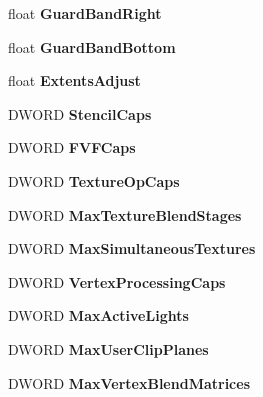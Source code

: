 \begin{DoxyCompactItemize}
float {\bfseries Guard\+Band\+Right}
\item 
\mbox{\label{struct___d3_d_c_a_p_s9_a34ac4032d786147f057750ec9b95ce71}} 
float {\bfseries Guard\+Band\+Bottom}
\item 
\mbox{\label{struct___d3_d_c_a_p_s9_aa41d6e883d3f68844b024e62942e3dd5}} 
float {\bfseries Extents\+Adjust}
\item 
\mbox{\label{struct___d3_d_c_a_p_s9_ad76d9ec88f7629e903bd767a4d9d4f0c}} 
D\+W\+O\+RD {\bfseries Stencil\+Caps}
\item 
\mbox{\label{struct___d3_d_c_a_p_s9_a76b5eb83a1b6f95d3cb099d84252556f}} 
D\+W\+O\+RD {\bfseries F\+V\+F\+Caps}
\item 
\mbox{\label{struct___d3_d_c_a_p_s9_a1410c802426ab8200222db89c7894464}} 
D\+W\+O\+RD {\bfseries Texture\+Op\+Caps}
\item 
\mbox{\label{struct___d3_d_c_a_p_s9_aab49bc1a7d113e6d75a3180d1d6cfd94}} 
D\+W\+O\+RD {\bfseries Max\+Texture\+Blend\+Stages}
\item 
\mbox{\label{struct___d3_d_c_a_p_s9_ab4b4e87cc5d9c9a2632f7305bd3fc760}} 
D\+W\+O\+RD {\bfseries Max\+Simultaneous\+Textures}
\item 
\mbox{\label{struct___d3_d_c_a_p_s9_a2b07e2ac2ff34eee9bd887e43b64f2a8}} 
D\+W\+O\+RD {\bfseries Vertex\+Processing\+Caps}
\item 
\mbox{\label{struct___d3_d_c_a_p_s9_ac0fb5cef31888a077a094e062a3cac12}} 
D\+W\+O\+RD {\bfseries Max\+Active\+Lights}
\item 
\mbox{\label{struct___d3_d_c_a_p_s9_a3c115e8c03a21248e33a7cabb3e62583}} 
D\+W\+O\+RD {\bfseries Max\+User\+Clip\+Planes}
\item 
\mbox{\label{struct___d3_d_c_a_p_s9_a988b1e0591123abed43f318759d2a9ba}} 
D\+W\+O\+RD {\bfseries Max\+Vertex\+Blend\+Matrices}

\end{DoxyCompactItemize}
